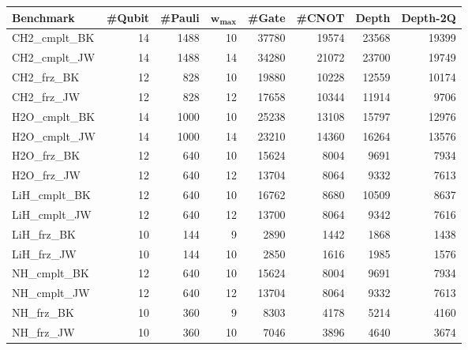 \begin{tabular}{|l|r|r|r|r|r|r|r|}
    \hline
    {Benchmark} & {\#Qubit} & {\#Pauli} & $\mathbf{w_{\max}}$ & {\#Gate} & {\#CNOT}  & {Depth} & {Depth-2Q} \\
    \hline
    \hline
    CH2\_cmplt\_BK & 14 & 1488 & 10 & 37780 & 19574 & 23568 & 19399 \\
    \hline
    CH2\_cmplt\_JW & 14 & 1488 & 14 & 34280 & 21072 & 23700 & 19749 \\
    \hline
    CH2\_frz\_BK & 12 & 828 & 10 & 19880 & 10228 & 12559 & 10174 \\
    \hline
    CH2\_frz\_JW & 12 & 828 & 12 & 17658 & 10344 & 11914 & 9706 \\
    \hline
    H2O\_cmplt\_BK & 14 & 1000 & 10 & 25238 & 13108 & 15797 & 12976 \\
    \hline
    H2O\_cmplt\_JW & 14 & 1000 & 14 & 23210 & 14360 & 16264 & 13576 \\
    \hline
    H2O\_frz\_BK & 12 & 640 & 10 & 15624 & 8004 & 9691 & 7934 \\
    \hline
    H2O\_frz\_JW & 12 & 640 & 12 & 13704 & 8064 & 9332 & 7613 \\
    \hline
    LiH\_cmplt\_BK & 12 & 640 & 10 & 16762 & 8680 & 10509 & 8637 \\
    \hline
    LiH\_cmplt\_JW & 12 & 640 & 12 & 13700 & 8064 & 9342 & 7616 \\
    \hline
    LiH\_frz\_BK & 10 & 144 & 9 & 2890 & 1442 & 1868 & 1438 \\
    \hline
    LiH\_frz\_JW & 10 & 144 & 10 & 2850 & 1616 & 1985 & 1576 \\
    \hline
    NH\_cmplt\_BK & 12 & 640 & 10 & 15624 & 8004 & 9691 & 7934 \\
    \hline
    NH\_cmplt\_JW & 12 & 640 & 12 & 13704 & 8064 & 9332 & 7613 \\
    \hline
    NH\_frz\_BK & 10 & 360 & 9 & 8303 & 4178 & 5214 & 4160 \\
    \hline
    NH\_frz\_JW & 10 & 360 & 10 & 7046 & 3896 & 4640 & 3674 \\
    \hline
\end{tabular}    
